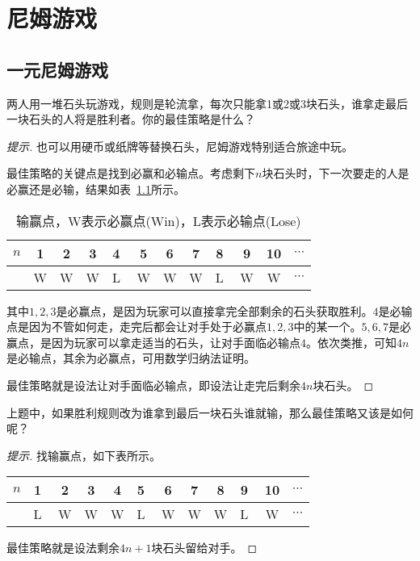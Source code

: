 
\chapter{尼姆游戏}
\label{chap:nim-game}

\section{一元尼姆游戏}
\label{sec:one-pile-nim-game}

\begin{example}
  两人用一堆石头玩游戏，规则是轮流拿，每次只能拿1或2或3块石头，谁拿走最后一块石头的人将是胜利者。你的最佳策略是什么？
\end{example}
\begin{proof}[提示]
  也可以用硬币或纸牌等替换石头，尼姆游戏特别适合旅途中玩。

  最佳策略的关键点是找到必赢和必输点。考虑剩下$n$块石头时，下一次要走的人是必赢还是必输，结果如表~\ref{tab:win-lose-position-of-one-pile-nim-game}所示。
  \begin{table}[htbp]
    \begin{minipage}{\textwidth}\centering
    \begin{tabular}{c|ccccccccccc}
      \toprule
      $n$ & 1 & 2 & 3 & \textcircled{4} & 5 & 6 & 7 & \textcircled{8} & 9 & 10 & $\cdots$ \\\hline
          & W & W & W & \textcircled{L} & W & W & W & \textcircled{L} & W & W  & $\cdots$ \\
      \bottomrule
    \end{tabular}
    \end{minipage}
    \caption{输赢点，W表示必赢点(Win)，L表示必输点(Lose)}
    \label{tab:win-lose-position-of-one-pile-nim-game}
  \end{table}

  其中$1,2,3$是必赢点，是因为玩家可以直接拿完全部剩余的石头获取胜利。$4$是必输点是因为不管如何走，走完后都会让对手处于必赢点$1,2,3$中的某一个。$5,6,7$是必赢点，是因为玩家可以拿走适当的石头，让对手面临必输点$4$。依次类推，可知$4n$是必输点，其余为必赢点，可用数学归纳法证明。

  最佳策略就是设法让对手面临必输点，即设法让走完后剩余$4n$块石头。
\end{proof}

\begin{example}
  上题中，如果胜利规则改为谁拿到最后一块石头谁就输，那么最佳策略又该是如何呢？
\end{example}
\begin{proof}[提示]
  找输赢点，如下表所示。
  \begin{center}
    \begin{tabular}{c|ccccccccccc}
      \toprule
      $n$ & \textcircled{1} & 2 & 3 & 4 & \textcircled{5} & 6 & 7 & 8 & \textcircled{9} & 10 & $\cdots$ \\\hline
          & \textcircled{L} & W & W & W & \textcircled{L} & W & W & W & \textcircled{L} & W  & $\cdots$ \\
      \bottomrule
    \end{tabular}
  \end{center}
  最佳策略就是设法剩余$4n+1$块石头留给对手。
\end{proof}

